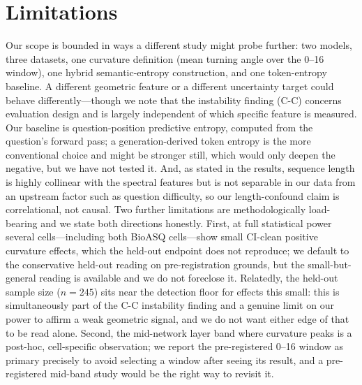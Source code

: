 \documentclass[11pt]{article}
\begin{document}
\section*{Limitations}
Our scope is bounded in ways a different study might probe further: two models, three datasets, one curvature definition (mean turning angle over the 0--16 window), one hybrid semantic-entropy construction, and one token-entropy baseline. A different geometric feature or a different uncertainty target could behave differently---though we note that the instability finding (C-C) concerns evaluation design and is largely independent of which specific feature is measured. Our baseline is question-position predictive entropy, computed from the question's forward pass; a generation-derived token entropy is the more conventional choice and might be stronger still, which would only deepen the negative, but we have not tested it. And, as stated in the results, sequence length is highly collinear with the spectral features but is not separable in our data from an upstream factor such as question difficulty, so our length-confound claim is correlational, not causal.
Two further limitations are methodologically load-bearing and we state both directions honestly. First, at full statistical power several cells---including both BioASQ cells---show small CI-clean positive curvature effects, which the held-out endpoint does not reproduce; we default to the conservative held-out reading on pre-registration grounds, but the small-but-general reading is available and we do not foreclose it. Relatedly, the held-out sample size ($n=245$) sits near the detection floor for effects this small: this is simultaneously part of the C-C instability finding and a genuine limit on our power to affirm a weak geometric signal, and we do not want either edge of that to be read alone. Second, the mid-network layer band where curvature peaks is a post-hoc, cell-specific observation; we report the pre-registered 0--16 window as primary precisely to avoid selecting a window after seeing its result, and a pre-registered mid-band study would be the right way to revisit it.
\end{document}
